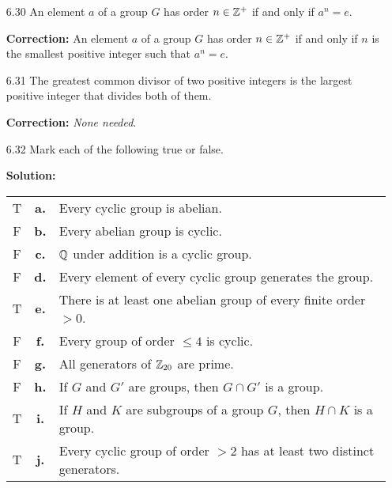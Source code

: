\begin{enumerate}
   \item[6.30] An element $a$ of a group $G$ has order $n \in \mathbb{Z}^+$ if and only
               if $a^n = e$.

      \textbf{Correction:} An element $a$ of a group $G$ has order $n \in \mathbb{Z}^+$ 
      if and only if $n$ is the smallest positive integer such that $a^n = e$.
   \item[6.31] The greatest common divisor of two positive integers is the
               largest positive integer that divides both of them.

      \textbf{Correction:} \textit{None needed}.
   \item[6.32] Mark each of the following true or false.

      \textbf{Solution:}

      \begin{tabularx}{\linewidth}{@{}c c X@{}} 
         T & \textbf{a.} & Every cyclic group is abelian. \\
         F & \textbf{b.} & Every abelian group is cyclic. \\
         F & \textbf{c.} & $\mathbb{Q}$ under addition is a cyclic group. \\
         F & \textbf{d.} & Every element of every cyclic group generates the
                           group. \\
         T & \textbf{e.} & There is at least one abelian group of every finite
                           order $>0$. \\
         F & \textbf{f.} & Every group of order $\le 4$ is cyclic. \\
         F & \textbf{g.} & All generators of $\mathbb{Z}_{20}$ are prime. \\
         F & \textbf{h.} & If $G$ and $G'$ are groups, then $G \cap G'$ is a
                           group. \\
         T & \textbf{i.} & If $H$ and $K$ are subgroups of a group $G$, then
                           $H \cap K$ is a group. \\
         T & \textbf{j.} & Every cyclic group of order $>2$ has at least two
                           distinct generators.
      \end{tabularx}
\end{enumerate}

